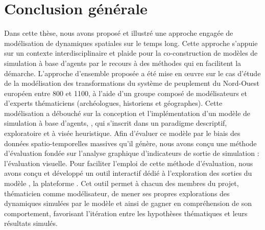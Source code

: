 \graphicspath{{chap7-Conclusion/}}

\chapter*{Conclusion générale}
\label{chap:conclu}

Dans cette thèse, nous avons proposé et illustré une approche engagée de modélisation de dynamiques spatiales sur le temps long.
Cette approche s'appuie sur un contexte interdisciplinaire et plaide pour la co-construction de modèles de simulation à base d'agents par le recours à des méthodes qui en facilitent la démarche.
L'approche d'ensemble proposée a été mise en œuvre sur le cas d'étude de la modélisation des transformations du système de peuplement du Nord-Ouest européen entre 800 et 1100, à l'aide d'un groupe composé de modélisateurs et d'experts thématiciens (archéologues, historiens et géographes).
Cette modélisation a débouché sur la conception et l'implémentation d'un modèle de simulation à base d'agents, \simfeodal{}, qui s'inscrit dans un paradigme descriptif, exploratoire et à visée heuristique.
Afin d'évaluer ce modèle par le biais des données spatio-temporelles massives qu'il génère, nous avons conçu une méthode d'évaluation fondée sur l'analyse graphique d'indicateurs de sortie de simulation :
	l'évaluation visuelle.
Pour faciliter l'emploi de cette méthode d'évaluation, nous avons conçu et développé un outil interactif dédié à l'exploration des sorties du modèle \simfeodal{}, la plateforme \simedb{}.
Cet outil permet à chacun des membres du projet, thématicien comme modélisateur, de mener ses propres explorations des dynamiques simulées par le modèle et ainsi de gagner en compréhension de son comportement, favorisant l'itération entre les hypothèses thématiques et leurs résultats simulés.

